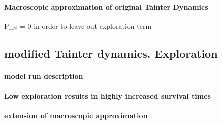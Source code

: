 \paragraph{Macroscopic approximation of original Tainter Dynamics}

P_e = 0 in order to leave out exploration term

\subsection{modified Tainter dynamics. Exploration}

\paragraph{model run description}

\paragraph{Low exploration results in highly increased survival times}

\paragraph{extension of macroscopic approximation}
